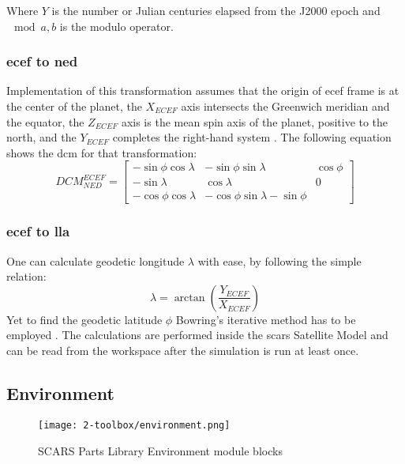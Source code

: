         Where $Y$ is the number or Julian centuries elapsed from the J2000 epoch and $\mod{a,b}$ is the modulo operator.

    \subsubsection{\ac{ecef} to \ac{ned}}
       Implementation of this transformation assumes that the origin of \ac{ecef} frame is at the center of the planet, the $X_{ECEF}$ axis intersects the Greenwich meridian and the equator, the $Z_{ECEF}$ axis is the mean spin axis of the planet, positive to the north, and the $Y_{ECEF}$ completes the right-hand system \cite{aboutareospace}. The following equation shows the \ac{dcm} for that transformation:
       \begin{equation}
           DCM^{ECEF}_{NED} = \begin{bmatrix} -\sin\phi\cos\lambda & -\sin\phi\sin\lambda & \cos\phi\\
               -\sin\lambda & \cos\lambda & 0 \\
               -\cos\phi\cos\lambda & -\cos\phi\sin\lambda -\sin\phi \end{bmatrix}
       \end{equation}

    \subsubsection{\ac{ecef} to \ac{lla}}
        One can calculate geodetic longitude $\lambda$ with ease, by following the simple relation:
        \begin{equation}
            \lambda = \arctan(\frac{Y_{ECEF}}{X_{ECEF}})
        \end{equation}
        Yet to find the geodetic latitude $\phi$ Bowring's iterative method has to be employed \cite{gerdan1999transforming}. The calculations are performed inside the \ac{scars} Satellite Model and can be read from the workspace after the simulation is run at least once.


\subsection{Environment}\label{sec:environment}

    \begin{figure}[H]
        \centering
        \texttt{[image: 2-toolbox/environment.png]}
        \caption{SCARS Parts Library Environment module blocks}
        \label{fig:environment}
    \end{figure}

